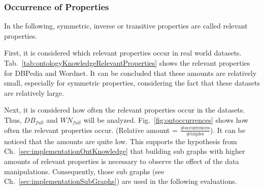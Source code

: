 \subsubsection{Occurrence of Properties}

In the following, symmetric, inverse or transitive properties are called relevant properties.

First, it is considered which relevant properties occur in real world datasets. Tab.~\ref{tab:ontologyKnowledgeRelevantProperties} shows the relevant properties for DBPedia and Wordnet. It can be concluded that these amounts are relatively small, especially for symmetric properties, considering the fact that these datasets are relatively large. 

Next, it is considered how often the relevant properties occur in the datasets.  Thus, $DB_{full}$ and $WN_{full}$ will be analyzed. Fig.~\ref{fig:ontoccurrences} shows how often the relevant properties occur. (Relative amount = $\frac{\text{\#occurrences}}{\text{\#triples}}$). It can be noticed that the amounts are quite low. This supports the hypothesis from Ch.~\ref{sec:implementationOntKnowledge} that building sub graphs with higher amounts of relevant properties is necessary to observe the effect of the data manipulations. Consequently, those sub graphs (see Ch.~\ref{sec:implementationSubGraphs}) are used in the following evaluations.

